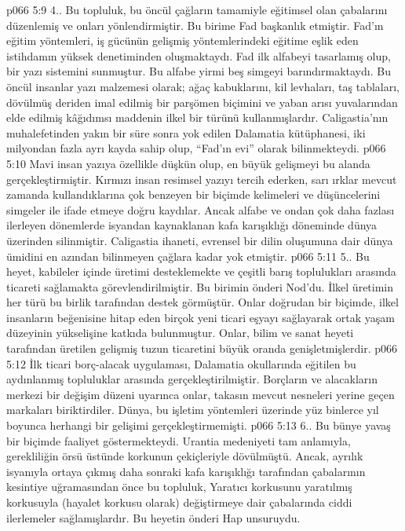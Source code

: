 \vs p066 5:9 4.\bibnobreakspace {}. Bu topluluk, bu öncül çağların tamamiyle eğitimsel olan çabalarını düzenlemiş ve onları yönlendirmiştir. Bu birime Fad başkanlık etmiştir. Fad’ın eğitim yöntemleri, iş gücünün gelişmiş yöntemlerindeki eğitime eşlik eden istihdamın yüksek denetiminden oluşmaktaydı. Fad ilk alfabeyi tasarlamış olup, bir yazı sistemini sunmuştur. Bu alfabe yirmi beş simgeyi barındırmaktaydı. Bu öncül insanlar yazı malzemesi olarak; ağaç kabuklarını, kil levhaları, taş tablaları, dövülmüş deriden imal edilmiş bir parşömen biçimini ve yaban arısı yuvalarından elde edilmiş kâğıdımsı maddenin ilkel bir türünü kullanmışlardır. Caligastia’nın muhalefetinden yakın bir süre sonra yok edilen Dalamatia kütüphanesi, iki milyondan fazla ayrı kayda sahip olup, “Fad’ın evi” olarak bilinmekteydi.
\vs p066 5:10 Mavi insan yazıya özellikle düşkün olup, en büyük gelişmeyi bu alanda gerçekleştirmiştir. Kırmızı insan resimsel yazıyı tercih ederken, sarı ırklar mevcut zamanda kullandıklarına çok benzeyen bir biçimde kelimeleri ve düşüncelerini simgeler ile ifade etmeye doğru kaydılar. Ancak alfabe ve ondan çok daha fazlası ilerleyen dönemlerde isyandan kaynaklanan kafa karışıklığı döneminde dünya üzerinden silinmiştir. Caligastia ihaneti, evrensel bir dilin oluşumuna dair dünya ümidini en azından bilinmeyen çağlara kadar yok etmiştir.
\vs p066 5:11 5.. Bu heyet, kabileler içinde üretimi desteklemekte ve çeşitli barış toplulukları arasında ticareti sağlamakta görevlendirilmiştir. Bu birimin önderi Nod'du. İlkel üretimin her türü bu birlik tarafından destek görmüştür. Onlar doğrudan bir biçimde, ilkel insanların beğenisine hitap eden birçok yeni ticari eşyayı sağlayarak ortak yaşam düzeyinin yükselişine katkıda bulunmuştur. Onlar, bilim ve sanat heyeti tarafından üretilen gelişmiş tuzun ticaretini büyük oranda genişletmişlerdir.
\vs p066 5:12 İlk ticari borç\hyp{}alacak uygulaması, Dalamatia okullarında eğitilen bu aydınlanmış topluluklar arasında gerçekleştirilmiştir. Borçların ve alacakların merkezi bir değişim düzeni uyarınca onlar, takasın mevcut nesneleri yerine geçen markaları biriktirdiler. Dünya, bu işletim yöntemleri üzerinde yüz binlerce yıl boyunca herhangi bir gelişimi gerçekleştirmemişti.
\vs p066 5:13 6.. Bu bünye yavaş bir biçimde faaliyet göstermekteydi. Urantia medeniyeti tam anlamıyla, gerekliliğin örsü üstünde korkunun çekiçleriyle dövülmüştü. Ancak, ayrılık isyanıyla ortaya çıkmış daha sonraki kafa karışıklığı tarafından çabalarının kesintiye uğramasından önce bu topluluk, Yaratıcı korkusunu yaratılmış korkusuyla (hayalet korkusu olarak) değiştirmeye dair çabalarında ciddi ilerlemeler sağlamışlardır. Bu heyetin önderi Hap unsuruydu.
